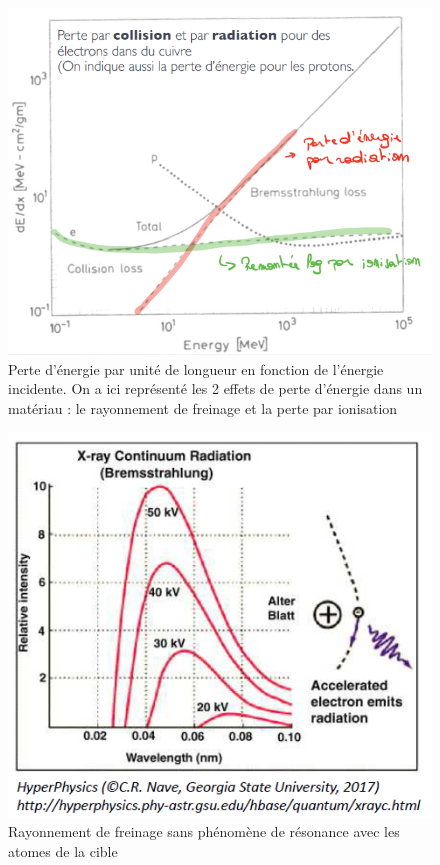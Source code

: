 \begin{figure}[htp]
    \centering
    \includegraphics[scale=0.8]{Images2/RésuméPerte.PNG}
    \caption{Perte d'énergie par unité de longueur en fonction de l'énergie incidente. On a ici représenté les 2 effets de perte d'énergie dans un matériau : le rayonnement de freinage et la perte par ionisation}
    \label{fig:Résumé pertes}
\end{figure}%
\begin{figure}[htp]
    \centering
    \includegraphics[scale=1.0]{Images2/FreinageIdéalisé.PNG}
    \caption{Rayonnement de freinage sans phénomène de résonance avec les atomes de la cible}
    \label{fig:Freinage idéalisé}
\end{figure}%

